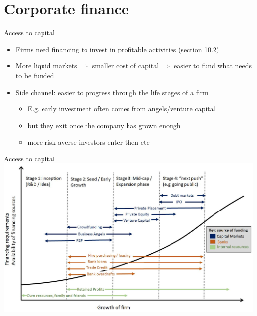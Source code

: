 \documentclass[english,10pt
,aspectratio=169
]{beamer}
\begin{document}
\section{Corporate finance}

\begin{frame}{Access to capital}
	\begin{itemize}
		\item Firms need financing to invest in profitable activities (section 10.2)
		\item More liquid markets $\Rightarrow$ smaller cost of capital $\Rightarrow$ easier to fund what needs to be funded
		\item Side channel: easier to progress through the life stages of a firm
		\begin{itemize}
			\item E.g. early investment often comes from angels/venture capital
			\item but they exit once the company has grown enough
			\item more risk averse investors enter then etc
		\end{itemize}
	\end{itemize}
\end{frame}


\begin{frame}{Access to capital}
	\centering
	\includegraphics[width=.7\paperwidth]{pics/funding}
\end{frame}
\end{document}
